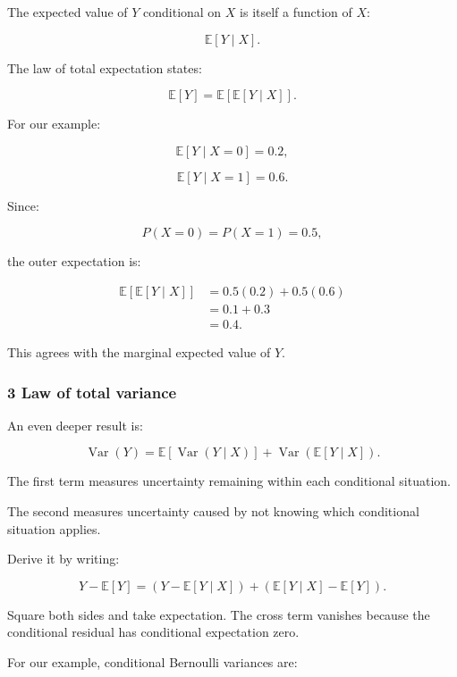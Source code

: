 \hypertarget{02-foundations-ii-ch023-law-of-total-expectation}{}

The expected value of \(Y\) conditional on \(X\) is itself a function of \(X\):

\[
 \mathbb E[Y\mid X].
\]

The law of total expectation states:

\[
 \boxed{ \mathbb E[Y]= \mathbb E[\mathbb E[Y\mid X]] }.
\]

For our example:

\[
 \mathbb E[Y\mid X=0]=0.2,
\]

\[
 \mathbb E[Y\mid X=1]=0.6.
\]

Since:

\[
 P(X=0)=P(X=1)=0.5,
\]

the outer expectation is:

\[
 \begin{aligned} \mathbb E[\mathbb E[Y\mid X]] &=0.5(0.2)+0.5(0.6)\\ &=0.1+0.3\\ &=\boxed{0.4}. \end{aligned}
\]

This agrees with the marginal expected value of \(Y\).

\subsubsection{3 Law of total variance}\label{02-foundations-ii-ch023-law-of-total-variance}

\hypertarget{02-foundations-ii-ch023-law-of-total-variance}{}

An even deeper result is:

\[
 \boxed{ \operatorname{Var}(Y) = \mathbb E[\operatorname{Var}(Y\mid X)] + \operatorname{Var}(\mathbb E[Y\mid X]) }.
\]

The first term measures uncertainty remaining within each conditional situation.

The second measures uncertainty caused by not knowing which conditional situation applies.

Derive it by writing:

\[
 Y-\mathbb E[Y] = (Y-\mathbb E[Y\mid X]) + (\mathbb E[Y\mid X]-\mathbb E[Y]).
\]

Square both sides and take expectation. The cross term vanishes because the conditional residual has conditional expectation zero.

For our example, conditional Bernoulli variances are:

